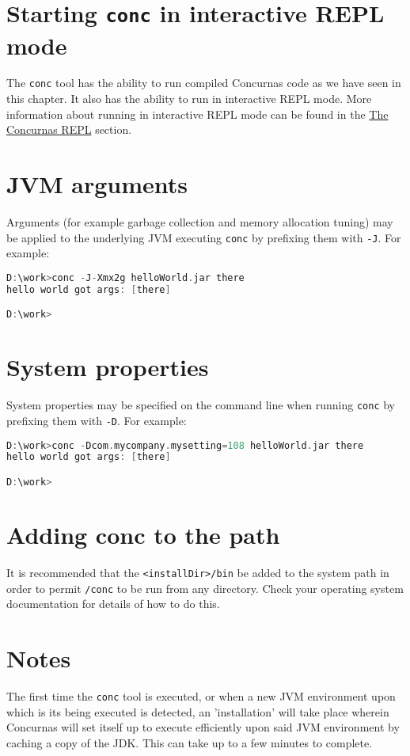 \documentclass[conc-doc]{subfiles}
\begin{document}
\section{Starting \lstinline!conc! in interactive REPL mode}
The \lstinline{conc} tool has the ability to run compiled Concurnas code as we have seen in this chapter. It also has the ability to run in interactive REPL mode. More information about running in interactive REPL mode can be found in the \hyperref[ch:repl]{The Concurnas REPL} section.

\section{JVM arguments}
Arguments (for example garbage collection and memory allocation tuning) may be applied to the underlying JVM executing \lstinline{conc} by prefixing them with \lstinline{-J}. For example:

\begin{lstlisting}[language=C]
D:\work>conc -J-Xmx2g helloWorld.jar there
hello world got args: [there]

D:\work>
\end{lstlisting}

\section{System properties}
System properties may be specified on the command line when running \lstinline{conc} by prefixing them with \lstinline{-D}. For example:

\begin{lstlisting}[language=C]
D:\work>conc -Dcom.mycompany.mysetting=108 helloWorld.jar there
hello world got args: [there]

D:\work>
\end{lstlisting}

\section{Adding conc to the path}
It is recommended that the \lstinline{<installDir>/bin} be added to the system path in order to permit \lstinline{/conc} to be run from any directory. Check your operating system documentation for details of how to do this.

\section{Notes}
The first time the \lstinline{conc} tool is executed, or when a new JVM environment upon which is its being executed is detected, an 'installation' will take place wherein Concurnas will set itself up to execute efficiently upon said JVM environment by caching a copy of the JDK. This can take up to a few minutes to complete.
\end{document}
